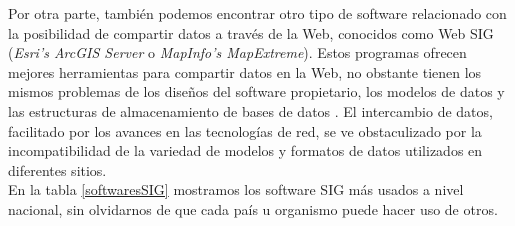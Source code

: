 Por otra parte, también podemos encontrar otro tipo de software relacionado con la posibilidad de compartir datos a través de la Web, conocidos como Web SIG (\textit{Esri’s ArcGIS Server} o \textit{MapInfo’s MapExtreme}). Estos programas ofrecen mejores herramientas para compartir datos en la Web, no obstante tienen los mismos problemas de los diseños del software propietario, los modelos de datos y las estructuras de almacenamiento de bases de datos \cite{libro-gis}. El intercambio de datos, facilitado por los avances en las tecnologías de red, se ve obstaculizado por la incompatibilidad de la variedad de modelos y formatos de datos utilizados en diferentes sitios. \\

En la tabla \ref{softwaresSIG} mostramos los software SIG más usados a nivel nacional, sin olvidarnos de que cada país u organismo puede hacer uso de otros.



